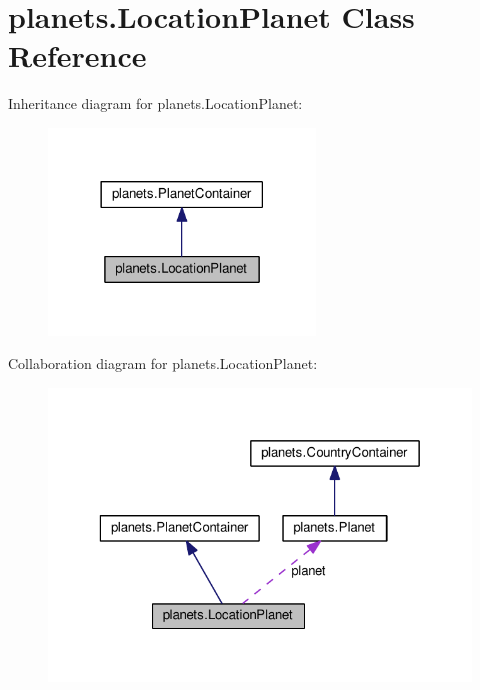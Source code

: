 \hypertarget{classplanets_1_1_location_planet}{}\section{planets.\+Location\+Planet Class Reference}
\label{classplanets_1_1_location_planet}


Inheritance diagram for planets.\+Location\+Planet\+:\nopagebreak
\begin{figure}[H]
\begin{center}
\leavevmode
\includegraphics[width=201pt]{classplanets_1_1_location_planet__inherit__graph}
\end{center}
\end{figure}


Collaboration diagram for planets.\+Location\+Planet\+:\nopagebreak
\begin{figure}[H]
\begin{center}
\leavevmode
\includegraphics[width=323pt]{classplanets_1_1_location_planet__coll__graph}
\end{center}
\end{figure}
